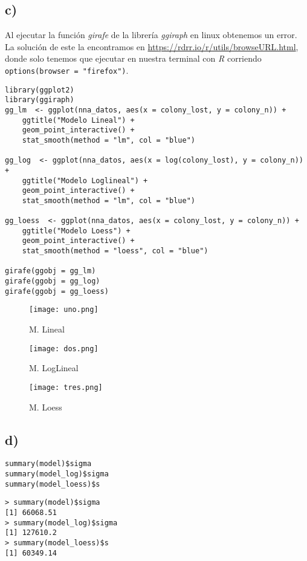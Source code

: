 \documentclass[b4paper]{article}
\begin{document}
    \subsection{c)}
    Al ejecutar la funci\'on \textit{girafe} de la librer\'ia \textit{ggiraph} en linux
    obtenemos un error. La soluci\'on de este la encontramos en \url{https://rdrr.io/r/utils/browseURL.html}, donde solo tenemos que ejecutar en nuestra terminal con \textit{R} corriendo \verb|options(browser = "firefox")|.
    \begin{tcolorbox}[title = input]
        \begin{verbatim}
library(ggplot2)
library(ggiraph)
gg_lm  <- ggplot(nna_datos, aes(x = colony_lost, y = colony_n)) +
    ggtitle("Modelo Lineal") +
    geom_point_interactive() +
    stat_smooth(method = "lm", col = "blue")

gg_log  <- ggplot(nna_datos, aes(x = log(colony_lost), y = colony_n)) +
    ggtitle("Modelo Loglineal") +
    geom_point_interactive() +
    stat_smooth(method = "lm", col = "blue")

gg_loess  <- ggplot(nna_datos, aes(x = colony_lost, y = colony_n)) +
    ggtitle("Modelo Loess") +
    geom_point_interactive() +
    stat_smooth(method = "loess", col = "blue")

girafe(ggobj = gg_lm)
girafe(ggobj = gg_log)
girafe(ggobj = gg_loess)\end{verbatim}
    \end{tcolorbox}
    \begin{figure}[h]
        \begin{minipage}[c]{0.33\textwidth}
            \centering
                \texttt{[image: uno.png]}
                \caption{M. Lineal}
        \end{minipage}
        \begin{minipage}[c]{0.33\textwidth}
            \centering
                \texttt{[image: dos.png]}
                \caption{M. LogLineal}
        \end{minipage}
        \begin{minipage}[c]{0.33\textwidth}
            \centering
                \texttt{[image: tres.png]}
                \caption{M. Loess}
        \end{minipage}
    \end{figure}
    \subsection{d)}
    \begin{tcolorbox}[title = input]
        \begin{verbatim}
summary(model)$sigma
summary(model_log)$sigma
summary(model_loess)$s\end{verbatim}
    \end{tcolorbox}
    \begin{tcolorbox}[title = output]
        \begin{verbatim}
> summary(model)$sigma
[1] 66068.51
> summary(model_log)$sigma
[1] 127610.2
> summary(model_loess)$s
[1] 60349.14\end{verbatim}
    \end{tcolorbox}
\end{document}
